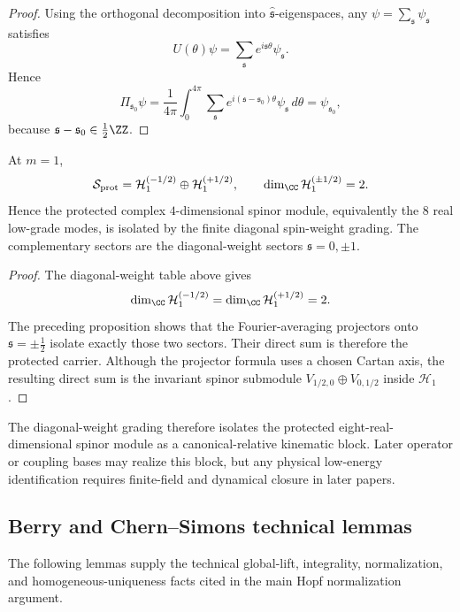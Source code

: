 \documentclass[11pt,a4paper]{article}
\begin{document}
\begin{proof}
Using the orthogonal decomposition into \(\hat{\mathfrak s}\)-eigenspaces, any \(\psi=\sum_{\mathfrak s}\psi_{\mathfrak s}\) satisfies
\[
U(\theta)\psi=\sum_{\mathfrak s}e^{i\mathfrak s\theta}\psi_{\mathfrak s}.
\]
Hence
\[
\Pi_{\mathfrak s_0}\psi
=
\frac{1}{4\pi}\int_0^{4\pi}
\sum_{\mathfrak s}e^{i(\mathfrak s-\mathfrak s_0)\theta}\psi_{\mathfrak s}\,d\theta
=
\psi_{\mathfrak s_0},
\]
because \(\mathfrak s-\mathfrak s_0\in\frac12\ZZ\).
\end{proof}

\begin{corollary}[Diagonal-weight isolation of the protected carrier at \(m=1\)]
\label{p2:cor:protected-diagonal-weight-carrier}
At \(m=1\),
\[
\mathcal S_{\rm prot}
=
\mathcal H_1^{(-1/2)}\oplus \mathcal H_1^{(+1/2)},
\qquad
\dim_\CC \mathcal H_1^{(\pm 1/2)}=2.
\]
Hence the protected complex \(4\)-dimensional spinor module, equivalently the \(8\) real low-grade modes, is isolated by the finite diagonal spin-weight grading.  The complementary sectors are the diagonal-weight sectors \(\mathfrak s=0,\pm 1\).
\end{corollary}

\begin{proof}
The diagonal-weight table above gives
\[
\dim_\CC \mathcal H_1^{(-1/2)}=\dim_\CC \mathcal H_1^{(+1/2)}=2.
\]
The preceding proposition shows that the Fourier-averaging projectors onto \(\mathfrak s=\pm\tfrac12\) isolate exactly those two sectors. Their direct sum is therefore the protected carrier.  Although the projector formula uses a chosen Cartan axis, the resulting direct sum is the invariant spinor submodule \(V_{1/2,0}\oplus V_{0,1/2}\) inside \(\mathcal H_1\).
\end{proof}

The diagonal-weight grading therefore isolates the protected eight-real-dimensional spinor module as a canonical-relative kinematic block. Later operator or coupling bases may realize this block, but any physical low-energy identification requires finite-field and dynamical closure in later papers.



\subsection{Berry and Chern--Simons technical lemmas}
\label{p2d:app:berry-technical}
The following lemmas supply the technical global-lift, integrality,
normalization, and homogeneous-uniqueness facts cited in the main Hopf
normalization argument.
\end{document}
